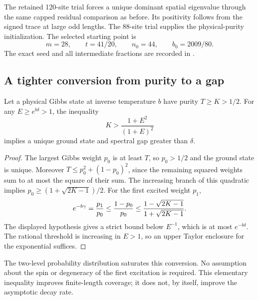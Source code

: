 The retained 120-site trial forces a unique dominant spatial
eigenvalue through the same capped residual comparison as before.
Its positivity follows from the signed trace at large odd lengths.
The 88-site trial supplies the physical-purity initialization.
The selected starting point is
\[
 m=28,\qquad t=41/20,\qquad n_0=44,\qquad b_0=2009/80.
\]
The exact seed and all intermediate fractions are recorded in
.

\subsection{A tighter conversion from purity to a gap}
\begin{lemma}\label{lem:tight-purity}
Let a physical Gibbs state at inverse temperature $b$ have purity
$T\ge K>1/2$. For any $E\ge e^{b\delta}>1$, the inequality
\[
 K>\frac{1+E^2}{(1+E)^2}
\]
implies a unique ground state and spectral gap greater than $\delta$.
\end{lemma}
\begin{proof}
The largest Gibbs weight $p_0$ is at least $T$, so $p_0>1/2$ and
the ground state is unique. Moreover
$T\le p_0^2+(1-p_0)^2$, since the remaining squared weights sum to
at most the square of their sum. The increasing branch of this
quadratic implies $p_0\ge(1+\sqrt{2K-1})/2$.
For the first excited weight $p_1$,
\[
 e^{-b\gamma}=\frac{p_1}{p_0}
 \le\frac{1-p_0}{p_0}
 \le\frac{1-\sqrt{2K-1}}{1+\sqrt{2K-1}}.
\]
The displayed hypothesis gives a strict bound below $E^{-1}$,
which is at most $e^{-b\delta}$. The rational threshold is increasing
in $E>1$, so an upper Taylor enclosure for the exponential suffices.
\end{proof}
The two-level probability distribution saturates this conversion.
No assumption about the spin or degeneracy of the first excitation
is required. This elementary inequality improves finite-length
coverage; it does not, by itself, improve the asymptotic decay rate.

